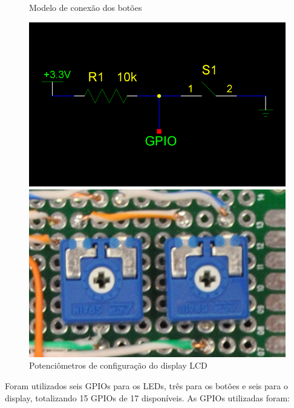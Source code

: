 \begin{figure}[htb]
	\centering
 	\begin{minipage}{0.45\textwidth}
		\centering
		\caption{\label{fig:push-btn-sketch}Modelo de conexão dos botões}
		\includegraphics[width=1\textwidth]{img/push-btn-sketch.png}
	\end{minipage}
	\hfill
	\begin{minipage}{0.45\textwidth}
		\centering
		\caption{\label{fig:potentiometer}Potenciômetros de configuração do display LCD}
		\includegraphics[width=1\textwidth]{img/potentiometer.jpg}
	\end{minipage}
\end{figure}

Foram utilizados seis GPIOs para os LEDs, três para os botões e seis para o display, totalizando 15 GPIOs de 17 disponíveis. As GPIOs utilizadas foram:

